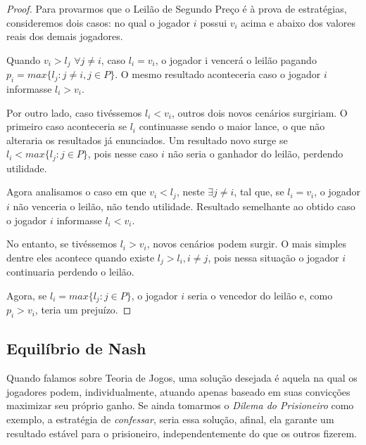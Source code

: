 \documentclass[twoside,conference,a4paper]{IEEEtran}
\begin{document}
                \begin{proof}
                    Para provarmos que o Leilão de Segundo Preço é à prova de estratégias, consideremos dois casos:  no qual o jogador $i$ possui $v_i$ acima e abaixo dos valores reais dos demais jogadores.
                
                    Quando $v_i > l_j$ $\forall j \neq i$, caso $l_i = v_i$, o jogador i vencerá o leilão pagando $p_i = max\{l_j : j \neq i, j \in P\}$. O mesmo resultado aconteceria caso o jogador $i$ informasse $l_i > v_i$. 
                    
                    Por outro lado, caso tivéssemos $l_i < v_i$, outros dois novos cenários surgiriam. O primeiro caso aconteceria se $l_i$ continuasse sendo o maior lance, o que não alteraria os resultados já enunciados. Um resultado novo surge se $l_i < max\{l_j : j \in P \}$, pois nesse caso $i$ não seria o ganhador do leilão, perdendo utilidade.
                    
                    Agora analisamos o caso em que $v_i < l_j$, neste $\exists j \neq i$, tal que, se $l_i = v_i$, o jogador $i$ não venceria o leilão, não tendo utilidade. Resultado semelhante ao obtido caso o jogador $i$ informasse $l_i < v_i$.
                    
                    No entanto, se tivéssemos $l_i > v_i$, novos cenários podem surgir. O mais simples dentre eles acontece quando existe $l_j > l_i, i \neq j$, pois nessa situação o jogador $i$ continuaria perdendo o leilão.
                    
                    Agora, se $l_i = max\{l_j : j \in P\}$, o jogador $i$ seria o vencedor do leilão e, como $p_i > v_i$, teria um prejuízo.
                    
                \end{proof}
                 
                
        \subsection{Equilíbrio de Nash} \label{sec: Nash}
            Quando falamos sobre Teoria de Jogos, uma solução desejada é aquela na qual os jogadores podem, individualmente, atuando apenas baseado em suas convicções maximizar seu próprio ganho. Se ainda tomarmos o \emph{Dilema do Prisioneiro} como exemplo, a estratégia de \emph{confessar}, seria essa solução, afinal, ela garante um resultado estável para o prisioneiro, independentemente do que os outros fizerem.
            
\end{document}
